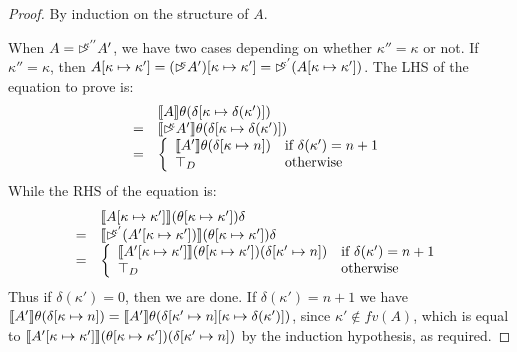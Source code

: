 \begin{proof}
  By induction on the structure of $A$.

  When $A = \mathord{\rhd\kern-0.4em^{\kappa''}}A'$, we have two cases depending on
  whether $\kappa'' = \kappa$ or not. If $\kappa'' = \kappa$, then
  $A[\kappa \mapsto \kappa'] = (\mathord{\rhd\kern-0.4em^{\kappa}} A')[\kappa \mapsto
  \kappa'] = \mathord{\rhd\kern-0.4em^{\kappa'}} (A[\kappa \mapsto \kappa'])$. The LHS of
  the equation to prove is:
  \begin{displaymath}
    \begin{array}{cl}
      & \llbracket A \rrbracket\theta (\delta[\kappa \mapsto \delta(\kappa')]) \\
      =& \llbracket \mathord{\rhd\kern-0.4em^{\kappa}}A' \rrbracket \theta (\delta[\kappa \mapsto \delta(\kappa')]) \\
      =& \left\{
        \begin{array}{ll}
          \llbracket A' \rrbracket\theta(\delta[\kappa \mapsto n]) & \textrm{if }\delta(\kappa') = n + 1 \\
          \top_D & \textrm{otherwise}
        \end{array}
      \right.
    \end{array}
  \end{displaymath}
  While the RHS of the equation is:
  \begin{displaymath}
    \begin{array}{cl}
      & \llbracket A[\kappa \mapsto \kappa'] \rrbracket(\theta[\kappa\mapsto\kappa'])\delta \\
      =&\llbracket \mathord{\rhd\kern-0.4em^{\kappa'}}(A'[\kappa\mapsto\kappa']) \rrbracket(\theta[\kappa\mapsto\kappa'])\delta \\
      =&\left\{
        \begin{array}{ll}
          \llbracket A'[\kappa\mapsto\kappa'] \rrbracket(\theta[\kappa\mapsto\kappa'])(\delta[\kappa' \mapsto n]) & \textrm{if }\delta(\kappa') = n + 1 \\
          \top_D & \textrm{otherwise}
        \end{array}
      \right.
    \end{array}
  \end{displaymath}
  Thus if $\delta(\kappa') = 0$, then we are done. If $\delta(\kappa')
  = n + 1$ we have $\llbracket A' \rrbracket\theta(\delta[\kappa\mapsto n]) =
  \llbracket A' \rrbracket\theta(\delta[\kappa'\mapsto n][\kappa \mapsto
  \delta(\kappa')])$, since $\kappa' \not\in \mathit{fv}(A)$, which is
  equal to
  $\llbracket A'[\kappa\mapsto\kappa'] \rrbracket(\theta[\kappa\mapsto\kappa'])(\delta[\kappa'\mapsto
  n])$ by the induction hypothesis, as required.


\end{proof}
